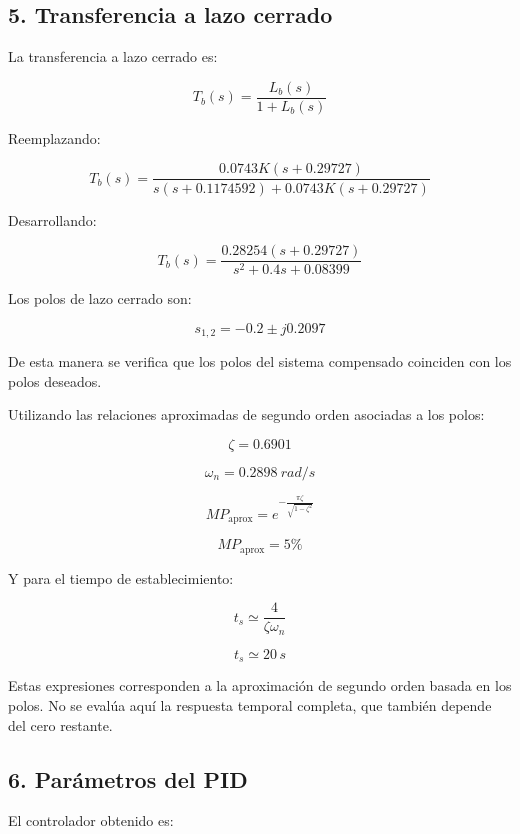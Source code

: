 \documentclass[10pt]{article}
\begin{document}
\subsection*{5. Transferencia a lazo cerrado}

La transferencia a lazo cerrado es:

\[
T_b(s)=\frac{L_b(s)}{1+L_b(s)}
\]

Reemplazando:

\[
T_b(s)=
\frac{
0.0743K(s+0.29727)
}{
s(s+0.1174592)+0.0743K(s+0.29727)
}
\]

Desarrollando:

\begin{equation}
\boxed{
T_b(s)=
\frac{0.28254(s+0.29727)}
{s^2+0.4s+0.08399}
}
\end{equation}

Los polos de lazo cerrado son:

\begin{equation}
\boxed{
s_{1,2}=-0.2\pm j0.2097
}
\end{equation}

De esta manera se verifica que los
polos del sistema compensado coinciden
con los polos deseados.

Utilizando las relaciones aproximadas
de segundo orden asociadas a los polos:

\[
\boxed{\zeta=0.6901}
\]

\[
\boxed{\omega_n=0.2898\ rad/s}
\]

\[
MP_{\mathrm{aprox}}
=e^{-\frac{\pi\zeta}{\sqrt{1-\zeta^2}}}
\]

\begin{equation}
\boxed{MP_{\mathrm{aprox}}=5\%}
\end{equation}

Y para el tiempo de establecimiento:

\[
t_s\simeq\frac{4}{\zeta\omega_n}
\]

\begin{equation}
\boxed{t_s\simeq20\,s}
\end{equation}

Estas expresiones corresponden a
la aproximación de segundo orden
basada en los polos. No se evalúa
aquí la respuesta temporal completa,
que también depende del cero restante.

\subsection*{6. Parámetros del PID}

El controlador obtenido es:
\end{document}
